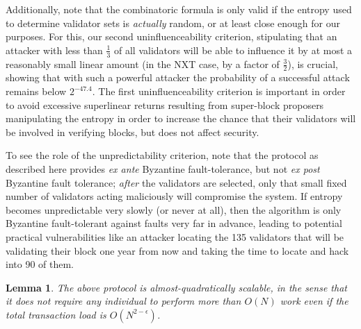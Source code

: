 \documentclass[11pt,a4paper]{article}
\theoremstyle{plain}
\newtheorem{lem}[thm]{Lemma}
\theoremstyle{definition}
\theoremstyle{remark}
\begin{document}
Additionally, note that the combinatoric formula is only valid if the entropy used to determine validator sets is \emph{actually} random, or at least close enough for our purposes. For this, our second uninfluenceability criterion, stipulating that an attacker with less than $\frac{1}{3}$ of all validators will be able to influence it by at most a reasonably small linear amount (in the NXT case, by a factor of $\frac{3}{2}$), is crucial, showing that with such a powerful attacker the probability of a successful attack remains below $2^{-47.4}$. The first uninfluenceability criterion is important in order to avoid excessive superlinear returns resulting from super-block proposers manipulating the entropy in order to increase the chance that their validators will be involved in verifying blocks, but does not affect security.

To see the role of the unpredictability criterion, note that the protocol as described here provides \emph{ex ante} Byzantine fault-tolerance, but not \emph{ex post} Byzantine fault tolerance; \emph{after} the validators are selected, only that small fixed number of validators acting maliciously will compromise the system. If entropy becomes unpredictable very slowly (or never at all), then the algorithm is only Byzantine fault-tolerant against faults very far in advance, leading to potential practical vulnerabilities like an attacker locating the 135 validators that will be validating their block one year from now and taking the time to locate and hack into 90 of them.

\begin{lem}
The above protocol is almost-quadratically scalable, in the sense that it does not require any individual to perform more than $O(N)$ work even if the total transaction load is $O(N^{2-\epsilon})$.
\end{lem}
\end{document}
